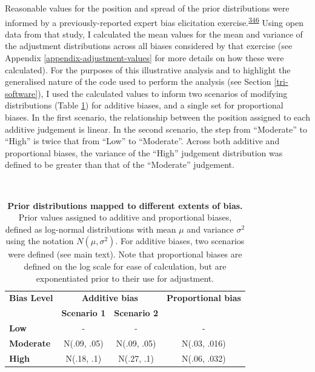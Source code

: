\documentclass[a4paper, twoside]{templates/ociamthesis}
\begin{document}
Reasonable values for the position and spread of the prior distributions were informed by a previously-reported expert bias elicitation exercise.\textsuperscript{\protect\hyperlink{ref-turner2009}{346}} Using open data from that study, I calculated the mean values for the mean and variance of the adjustment distributions across all biases considered by that exercise (see Appendix \ref{appendix-adjustment-values} for more details on how these were calculated). For the purposes of this illustrative analysis and to highlight the generalised nature of the code used to perform the analysis (see Section \ref{tri-software}), I used the calculated values to inform two scenarios of modifying distributions (Table \ref{tab:priorsAdd-table}) for additive biases, and a single set for proportional biases. In the first scenario, the relationship between the position assigned to each additive judgement is linear. In the second scenario, the step from ``Moderate'' to ``High'' is twice that from ``Low'' to ``Moderate''. Across both additive and proportional biases, the variance of the ``High'' judgement distribution was defined to be greater than that of the ``Moderate'' judgement.

~





\begin{table}[H]

\caption[Prior distributions mapped to different extents of bias.]{\label{tab:priorsAdd-table}\textbf{Prior distributions mapped to different extents of bias.} Prior values assigned to additive and proportional biases, defined as log-normal distributions with mean \(\mu\) and variance \(\sigma^2\) using the notation \(N(\mu,\sigma^{2})\). For additive biases, two scenarios were defined (see main text). Note that proportional biases are defined on the log scale for ease of calculation, but are exponentiated prior to their use for adjustment.}
\centering
\begin{tabular}[t]{>{}lccc}
\toprule
\multicolumn{1}{c}{\textbf{Bias Level}} & \multicolumn{2}{c}{\textbf{Additive bias}} & \multicolumn{1}{c}{\textbf{Proportional bias}} \\
\textbf{} & \textbf{Scenario 1} & \textbf{Scenario 2} & \textbf{}\\
\midrule
\textbf{Low} & - & - & -\\
\midrule
\textbf{Moderate} & N(.09, .05) & N(.09, .05) & N(.03, .016)\\
\midrule
\textbf{High} & N(.18, .1) & N(.27, .1) & N(.06, .032)\\
\bottomrule
\end{tabular}
\end{table}
\end{document}
